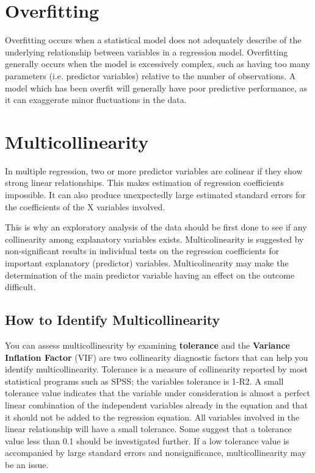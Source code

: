 
\section{Overfitting}
Overfitting occurs when a statistical model does not adequately describe of the underlying relationship between variables in a regression model. Overfitting generally occurs when the model is excessively complex, such as having too many parameters (i.e. predictor variables) relative to the number of observations. A model which has been overfit will generally have poor predictive performance, as it can exaggerate minor fluctuations in the data.

\newpage
\section{Multicollinearity}
In multiple regression, two or more predictor variables are colinear if they show strong linear relationships. This makes estimation of regression coefficients impossible. It can also produce unexpectedly large estimated standard errors for the coefficients of the X variables involved.

This is why an exploratory analysis of the data should be first done to see if any collinearity among explanatory variables exists. Multicolinearity is suggested by non-significant results in individual tests on the regression coefficients for important explanatory (predictor) variables. Multicolinearity may make the determination of the main predictor variable having an effect on the outcome difficult.

\subsection{How to Identify Multicollinearity}


     You can assess multicollinearity by examining \textbf{tolerance} and the \textbf{Variance Inflation Factor} (VIF) are two collinearity diagnostic factors that can help you identify multicollinearity. Tolerance is a measure of collinearity reported by most statistical programs such as SPSS; the variables tolerance is 1-R2. A small tolerance value indicates that the variable under consideration is almost a perfect linear combination of the independent variables already in the equation and that it should not be added to the regression equation. All variables involved in the linear relationship will have a small tolerance. Some suggest that a tolerance value less than 0.1 should be investigated further. If a low tolerance value is accompanied by large standard errors and nonsignificance, multicollinearity may be an issue.


